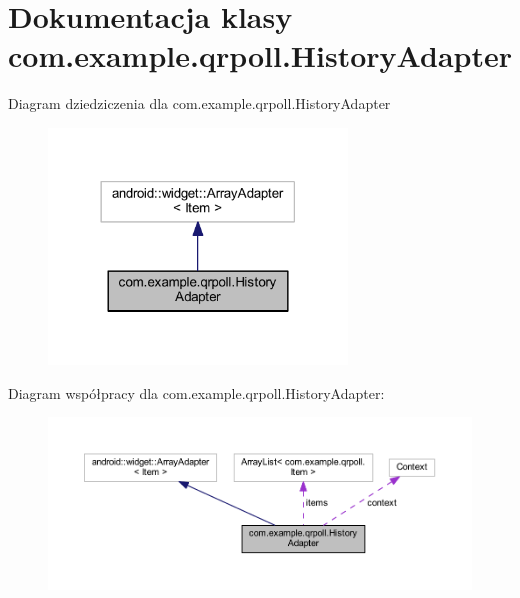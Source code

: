 \hypertarget{classcom_1_1example_1_1qrpoll_1_1_history_adapter}{\section{Dokumentacja klasy com.\+example.\+qrpoll.\+History\+Adapter}
\label{classcom_1_1example_1_1qrpoll_1_1_history_adapter}
}


Diagram dziedziczenia dla com.\+example.\+qrpoll.\+History\+Adapter\nopagebreak
\begin{figure}[H]
\begin{center}
\leavevmode
\includegraphics[width=225pt]{classcom_1_1example_1_1qrpoll_1_1_history_adapter__inherit__graph}
\end{center}
\end{figure}


Diagram współpracy dla com.\+example.\+qrpoll.\+History\+Adapter\+:\nopagebreak
\begin{figure}[H]
\begin{center}
\leavevmode
\includegraphics[width=350pt]{classcom_1_1example_1_1qrpoll_1_1_history_adapter__coll__graph}
\end{center}
\end{figure}
